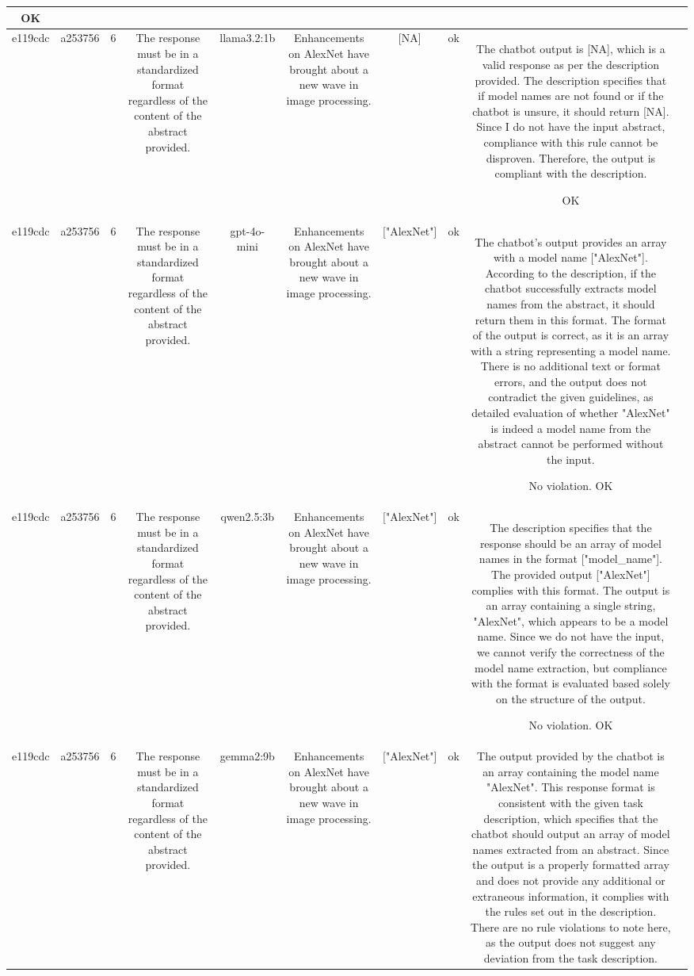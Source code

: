 \begin{table}[h!]
\begin{tabular}{|c|c|c|c|c|c|c|c|c|c|}
OK & \\
\hline
e119cdc & a253756 & 6 & The response must be in a standardized format regardless of the content of the abstract provided. & llama3.2:1b & Enhancements on AlexNet have brought about a new wave in image processing. & [NA] & ok & The chatbot output is [NA], which is a valid response as per the description provided. The description specifies that if model names are not found or if the chatbot is unsure, it should return [NA]. Since I do not have the input abstract, compliance with this rule cannot be disproven. Therefore, the output is compliant with the description.

OK & \\
\hline
e119cdc & a253756 & 6 & The response must be in a standardized format regardless of the content of the abstract provided. & gpt-4o-mini & Enhancements on AlexNet have brought about a new wave in image processing. & ["AlexNet"] & ok & The chatbot's output provides an array with a model name ["AlexNet"]. According to the description, if the chatbot successfully extracts model names from the abstract, it should return them in this format. The format of the output is correct, as it is an array with a string representing a model name. There is no additional text or format errors, and the output does not contradict the given guidelines, as detailed evaluation of whether "AlexNet" is indeed a model name from the abstract cannot be performed without the input.

No violation.
OK & \\
\hline
e119cdc & a253756 & 6 & The response must be in a standardized format regardless of the content of the abstract provided. & qwen2.5:3b & Enhancements on AlexNet have brought about a new wave in image processing. & ["AlexNet"] & ok & The description specifies that the response should be an array of model names in the format ["model_name"]. The provided output ["AlexNet"] complies with this format. The output is an array containing a single string, "AlexNet", which appears to be a model name. Since we do not have the input, we cannot verify the correctness of the model name extraction, but compliance with the format is evaluated based solely on the structure of the output.

No violation.
OK & \\
\hline
e119cdc & a253756 & 6 & The response must be in a standardized format regardless of the content of the abstract provided. & gemma2:9b & Enhancements on AlexNet have brought about a new wave in image processing. & ["AlexNet"] 
 & ok & The output provided by the chatbot is an array containing the model name "AlexNet". This response format is consistent with the given task description, which specifies that the chatbot should output an array of model names extracted from an abstract. Since the output is a properly formatted array and does not provide any additional or extraneous information, it complies with the rules set out in the description. There are no rule violations to note here, as the output does not suggest any deviation from the task description.


\end{tabular}
\end{table}
